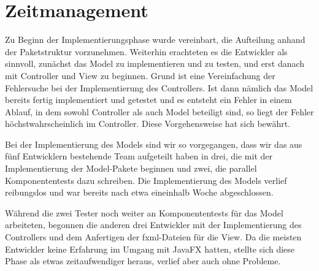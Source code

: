 \documentclass[parskip=full,11pt]{scrartcl}
\begin{document}
\section{Zeitmanagement}
Zu Beginn der Implementierungsphase wurde vereinbart, die Aufteilung anhand der Paketstruktur vorzunehmen. Weiterhin erachteten es die Entwickler als sinnvoll, zunächst das Model zu implementieren und zu testen, und erst danach mit Controller und View zu beginnen. Grund ist eine Vereinfachung der Fehlersuche bei der Implementierung des Controllers. Ist dann nämlich das Model bereits fertig implementiert und getestet und es entsteht ein Fehler in einem Ablauf, in dem sowohl Controller als auch Model beteiligt sind, so liegt der Fehler höchstwahrscheinlich im Controller. Diese Vorgehensweise hat sich bewährt.

Bei der Implementierung des Models sind wir so vorgegangen, dass wir das aus fünf Entwicklern bestehende Team aufgeteilt haben in drei, die mit der Implementierung der Model-Pakete beginnen und zwei, die parallel Komponententests dazu schreiben. Die Implementierung des Models verlief reibungslos und war bereits nach etwa eineinhalb Woche abgeschlossen.

Während die zwei Tester noch weiter an Komponententests für das Model arbeiteten, begonnen die anderen drei Entwickler mit der Implementierung des Controllers und dem Anfertigen der fxml-Dateien für die View. Da die meisten Entwickler keine Erfahrung im Umgang mit JavaFX hatten, stellte sich diese Phase als etwas zeitaufwendiger heraus, verlief aber auch ohne Probleme.
\end{document}
